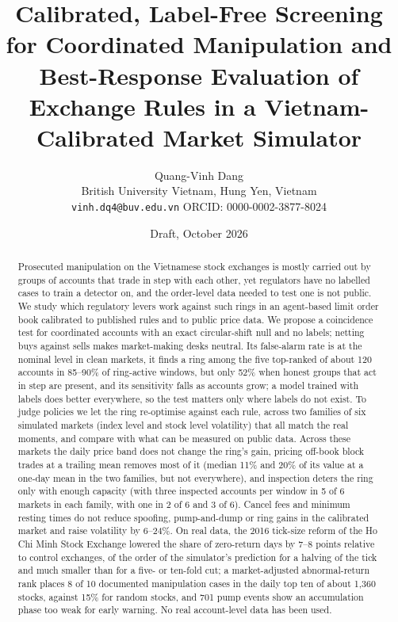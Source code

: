 \documentclass[11pt,a4paper]{article}
\title{Calibrated, Label-Free Screening for Coordinated Manipulation and Best-Response Evaluation of Exchange Rules in a Vietnam-Calibrated Market Simulator}
\author{Quang-Vinh Dang\\
British University Vietnam, Hung Yen, Vietnam\\
\texttt{vinh.dq4@buv.edu.vn} \quad ORCID: 0000-0002-3877-8024}
\date{Draft, October 2026}
\begin{document}
\maketitle

\begin{abstract}
Prosecuted manipulation on the Vietnamese stock exchanges is mostly carried out by groups of accounts that trade in step with each other, yet regulators have no labelled cases to train a detector on, and the order-level data needed to test one is not public. We study which regulatory levers work against such rings in an agent-based limit order book calibrated to published rules and to public price data. We propose a coincidence test for coordinated accounts with an exact circular-shift null and no labels; netting buys against sells makes market-making desks neutral. Its false-alarm rate is at the nominal level in clean markets, it finds a ring among the five top-ranked of about 120 accounts in 85--90\% of ring-active windows, but only 52\% when honest groups that act in step are present, and its sensitivity falls as accounts grow; a model trained with labels does better everywhere, so the test matters only where labels do not exist. To judge policies we let the ring re-optimise against each rule, across two families of six simulated markets (index level and stock level volatility) that all match the real moments, and compare with what can be measured on public data. Across these markets the daily price band does not change the ring's gain, pricing off-book block trades at a trailing mean removes most of it (median 11\% and 20\% of its value at a one-day mean in the two families, but not everywhere), and inspection deters the ring only with enough capacity (with three inspected accounts per window in 5 of 6 markets in each family, with one in 2 of 6 and 3 of 6). Cancel fees and minimum resting times do not reduce spoofing, pump-and-dump or ring gains in the calibrated market and raise volatility by 6--24\%. On real data, the 2016 tick-size reform of the Ho Chi Minh Stock Exchange lowered the share of zero-return days by 7--8 points relative to control exchanges, of the order of the simulator's prediction for a halving of the tick and much smaller than for a five- or ten-fold cut; a market-adjusted abnormal-return rank places 8 of 10 documented manipulation cases in the daily top ten of about 1,360 stocks, against 15\% for random stocks, and 701 pump events show an accumulation phase too weak for early warning. No real account-level data has been used.
\end{abstract}
\end{document}
